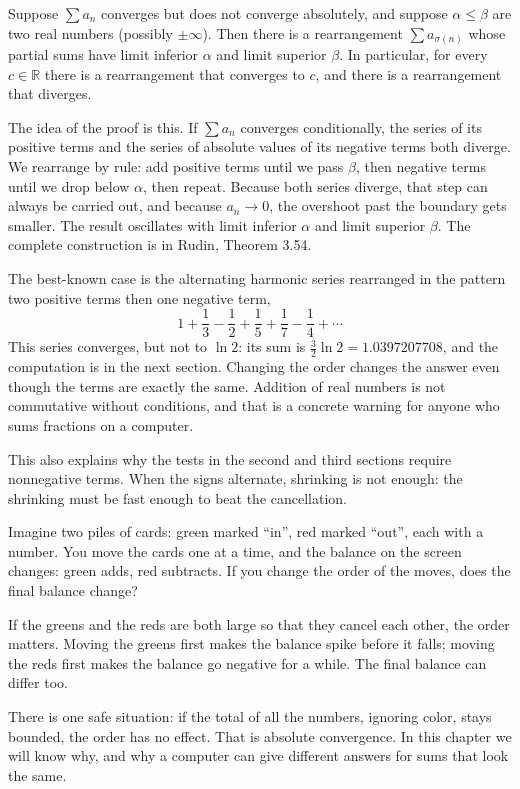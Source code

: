 \begin{teorema}
Suppose $\sum a_n$ converges but does not converge absolutely, and suppose $\alpha \le
\beta$ are two real numbers (possibly $\pm\infty$). Then there is a rearrangement
$\sum a_{\sigma(n)}$ whose partial sums have limit inferior $\alpha$ and limit superior
$\beta$. In particular, for every $c \in \mathbb{R}$ there is a rearrangement that
converges to $c$, and there is a rearrangement that diverges.
\end{teorema}

The idea of the proof is this. If $\sum a_n$ converges conditionally, the series of its
positive terms and the series of absolute values of its negative terms both diverge. We
rearrange by rule: add positive terms until we pass $\beta$, then negative terms until we
drop below $\alpha$, then repeat. Because both series diverge, that step can always be
carried out, and because $a_n \to 0$, the overshoot past the boundary gets smaller. The
result oscillates with limit inferior $\alpha$ and limit superior $\beta$. The complete
construction is in Rudin, Theorem 3.54.

The best-known case is the alternating harmonic series rearranged in the pattern two
positive terms then one negative term,
\[
  1 + \frac{1}{3} - \frac{1}{2} + \frac{1}{5} + \frac{1}{7} - \frac{1}{4} + \cdots
\]
This series converges, but not to $\ln 2$: its sum is $\tfrac{3}{2}\ln 2 = 1.0397207708$,
and the computation is in the next section. Changing the order changes the answer even
though the terms are exactly the same. Addition of real numbers is not commutative without
conditions, and that is a concrete warning for anyone who sums fractions on a computer.

This also explains why the tests in the second and third sections require nonnegative terms.
When the signs alternate, shrinking is not enough: the shrinking must be fast enough to beat
the cancellation.

\begin{untukanak}
Imagine two piles of cards: green marked ``in'', red marked ``out'', each with a number.
You move the cards one at a time, and the balance on the screen changes: green adds, red
subtracts. If you change the order of the moves, does the final balance change?

If the greens and the reds are both large so that they cancel each other, the order
matters. Moving the greens first makes the balance spike before it falls; moving the reds
first makes the balance go negative for a while. The final balance can differ too.

There is one safe situation: if the total of all the numbers, ignoring color, stays bounded,
the order has no effect. That is absolute convergence. In this chapter we will know why, and
why a computer can give different answers for sums that look the same.
\end{untukanak}

